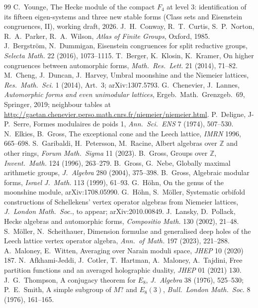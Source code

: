 \documentclass[11pt]{amsart}
\theoremstyle{definition}
\newcommand{\Z}{\mathbb{Z}}\newcommand{\Q}{\mathbb{Q}}\newcommand{\R}{\mathbb{R}}\newcommand{\A}{\mathbb{A}}\newcommand{\F}{\mathbb{F}}
\begin{document}
\begin{thebibliography}{99}
 C.~Younge, The Hecke module of the compact $F_4$ at level $3$: identification of its fifteen eigen-systems and three new stable forms (Class sets and Eisenstein congruences, II), working draft, 2026.
 J.~H.~Conway, R.~T.~Curtis, S.~P.~Norton, R.~A.~Parker, R.~A.~Wilson, \emph{Atlas of Finite Groups}, Oxford, 1985.
 J.~Bergstr\"om, N.~Dummigan, Eisenstein congruences for split reductive groups, \emph{Selecta Math.} 22 (2016), 1073--1115.
 T.~Berger, K.~Klosin, K.~Kramer, On higher congruences between automorphic forms, \emph{Math.\ Res.\ Lett.} 21 (2014), 71--82.
 M.~Cheng, J.~Duncan, J.~Harvey, Umbral moonshine and the Niemeier lattices, \emph{Res.\ Math.\ Sci.} 1 (2014), Art.\ 3; arXiv:1307.5793.
 G.~Chenevier, J.~Lannes, \emph{Automorphic forms and even unimodular lattices}, Ergeb.\ Math.\ Grenzgeb.\ 69, Springer, 2019; neighbour tables at \url{http://gaetan.chenevier.perso.math.cnrs.fr/niemeier/niemeier.html}.
 P.~Deligne, J-P.~Serre, Formes modulaires de poids 1, \emph{Ann.\ Sci.\ ENS} 7 (1974), 507--530.
 N.~Elkies, B.~Gross, The exceptional cone and the Leech lattice, \emph{IMRN} 1996, 665--698.
 S.~Garibaldi, H.~Petersson, M.~Racine, Albert algebras over $\Z$ and other rings, \emph{Forum Math.\ Sigma} 11 (2023).
 B.~Gross, Groups over $\Z$, \emph{Invent.\ Math.} 124 (1996), 263--279.
 B.~Gross, G.~Nebe, Globally maximal arithmetic groups, \emph{J.\ Algebra} 280 (2004), 375--398.
 B.~Gross, Algebraic modular forms, \emph{Israel J.\ Math.} 113 (1999), 61--93.
 G.~H\"ohn, On the genus of the moonshine module, arXiv:1708.05990.
 G.~H\"ohn, S.~M\"oller, Systematic orbifold constructions of Schellekens' vertex operator algebras from Niemeier lattices, \emph{J.\ London Math.\ Soc.}, to appear; arXiv:2010.00849.
 J.~Lansky, D.~Pollack, Hecke algebras and automorphic forms, \emph{Compositio Math.} 130 (2002), 21--48.
 S.~M\"oller, N.~Scheithauer, Dimension formulae and generalised deep holes of the Leech lattice vertex operator algebra, \emph{Ann.\ of Math.} 197 (2023), 221--288.
 A.~Maloney, E.~Witten, Averaging over Narain moduli space, \emph{JHEP} 10 (2020) 187.
 N.~Afkhami-Jeddi, J.~Cotler, T.~Hartman, A.~Maloney, A.~Tajdini, Free partition functions and an averaged holographic duality, \emph{JHEP} 01 (2021) 130.
 J.~G.~Thompson, A conjugacy theorem for $E_8$, \emph{J.\ Algebra} 38 (1976), 525--530; P.~E.~Smith, A simple subgroup of $M?$ and $E_8(3)$, \emph{Bull.\ London Math.\ Soc.} 8 (1976), 161--165.

\end{thebibliography}
\end{document}

